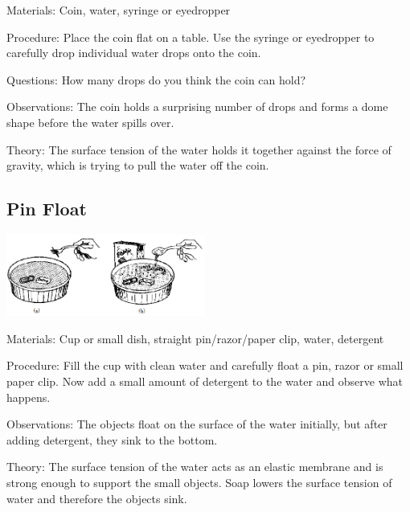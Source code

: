 \begin{multicols}{2}
\begin{description*}
\item[Materials:]{Coin, water, syringe or eyedropper}
\item[Procedure:]{Place the coin flat on a table. Use the syringe or eyedropper to carefully drop individual water drops onto the coin.}
\item[Questions:]{How many drops do you think the coin can hold?}
\item[Observations:]{The coin holds a surprising number of drops and forms a dome shape before the water spills over.}
\item[Theory:]{The surface tension of the water holds it together against the force of gravity, which is trying to pull the water off the coin.}
\end{description*}

\subsection{Pin Float}

\begin{center}
\includegraphics[width=0.49\textwidth]{./img/source/pin-float.png}
\end{center}

\begin{description*}
\item[Materials:]{Cup or small dish, straight pin/razor/paper clip, water, detergent}
\item[Procedure:]{Fill the cup with clean water and carefully float a pin, razor or small paper clip. Now add a small amount of detergent to the water and observe what happens.}
\item[Observations:]{The objects float on the surface of the water initially, but after adding detergent, they sink to the bottom.}
\item[Theory:]{The surface tension of the water acts as an elastic membrane and is strong enough to support the small objects. Soap lowers the surface tension of water and therefore the objects sink.}
\end{description*}


\end{multicols}
